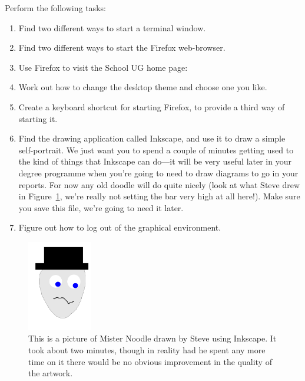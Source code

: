 Perform the following tasks:
\begin{enumerate}
\item Find two different ways to start a terminal window.
\item Find two different ways to start the Firefox web-browser.
\item Use Firefox to visit the School UG home page:
\item Work out how to change the desktop theme and choose one you like.
\item Create a keyboard shortcut for starting Firefox, to provide a third way of starting it.
\item Find the  drawing application called Inkscape, and use it to draw a simple self-portrait. We just want you to spend a couple of minutes getting used to the kind of things that Inkscape can do---it will be very useful later in your degree programme when you're going to need to draw diagrams to go in your reports. For now any old doodle will do quite nicely (look at what Steve drew in Figure~\ref{figure:mrnoodle}, we're really not setting the bar very high at all here!). Make sure you save this file, we're going to need it later.
\item Figure out how to log out of the graphical environment. \label{list:logout}
\end{enumerate}

\begin{figure}[t]
\centerline{\includegraphics[width=0.25\textwidth]{images/mrnoodle}}
\caption{This is a picture of Mister Noodle drawn by Steve using Inkscape. It took about two minutes, though in reality had he spent any more time on it there would be no obvious improvement in the quality of the artwork.}\label{figure:mrnoodle}
\end{figure}

